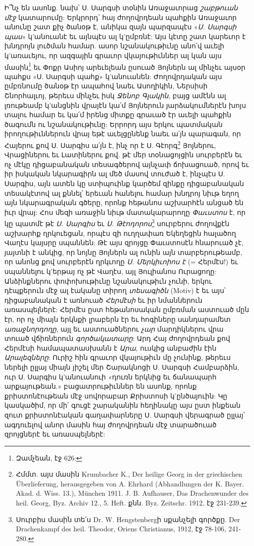 \documentclass{article}
\begin{document}
{Ի՞նչ են ասոնք. նախ՝ Ս. Սարգսի տօնին Առաջաւորաց \emph{շաբթուան մէջ} կատարումը: Երկրորդ՝ հայ ժողովրդեան պահքին Առաջաւոր անունը շատ քիչ ծանօթ է, անիկա զայն պարզապէս «\emph{Ս. Սարգսի պաս}» կ'անուանէ եւ այնպէս ալ կ'ըմբռնէ: Այս կէտը շատ կարեւոր է խնդրոյն լուծման համար. ասոր նշանակութիւնը անո՛վ աւելի կ'առաւեյու, որ ազգային գրաւոր վկայութիւններ ալ կան այս մասին\footnote{Զամչեան, էջ 626:} եւ Փոքր Ասիոյ արեւելեան ըսուած Յոյներն ալ մինչեւ այսօր պահքս «Ս. Սարգսի պահք» կ'անուանեն: Ժողովրդական այս ըմբռնումը ծանօթ էր ապահով նաեւ Ասողիկին, Ներսիսի Շնորհալւոյ, թերեւս մինչեւ իսկ \emph{Ջենոբ Գլակին}, բայց ամէնն ալ լռութեամբ կ'անցնին վրայէն կա՛մ Յոյներուն յարձակումներէն խոյս տալու համար եւ կա՛մ իրենց միտքը գրաւած էր աւելի պահքին ծագումն ու նշանակութիւնը: Երրորդ այս երկու պատմական իրողութիւններուն վրայ եթէ աւելցընենք նաեւ ա՛յն պարագան, որ Հայերու քով Ս. Սարգիս ա՛յն է, ինչ որ է Ս. Գէորգ\footnote{Հմմտ. այս մասին Krumbacher K., Der heilige Georg in der griechischen Überlieferung, herausgegeben von A. Ehrhard (Abhandlungen der K. Bayer. Akad. d. Wiss. 13.), München 1911. J. B. Aufhauser, Das Drachenwunder des heil. Georg, Byz. Archiv 12., 5. Heft. քնն. Byz. Zeitschr. 1912, էջ 231-239.} Յոյներու, Վրացիներու եւ Լատիներու քով. թէ մեր տօնացոյցին սուրբերէն եւ ոչ մէկը դիցաբանական տեսագծերով այնչափ ճոխացուած, որով եւ իր իսկական նկարագիրն ալ մեծ մասով տուժած է, ինչպէս Ս. Սարգիս, այն ատեն կը ստիպուինք կարծեմ զինքը դիցաբանական տեսակէտով ալ քննել՝ երեւան հանելու համար խնդրոյ նիւթ եղող այն նկարագրական գծերը, որոնք հեթանոս աշխարհէն անցած են իւր վրայ: Հոս մեզի առաջին նիւթ մատակարարողը \emph{Փաւստոս} է, որ կը պատմէ թէ \emph{Ս. Սարգիս} եւ \emph{Ս. Թէոդորոս}\footnote{Սուրբիս մասին տե՛ս Dr. W. Hengstenbergի սքանչելի գործքը. Der Drachenkampf des heil. Theodor, Oriens Christianus, 1912, էջ 78-106, 241-280.} սուրբերու ժողովքէն աշխարհք ղրկուեցան, որպէս զի ուղղափառ Եկեղեցին հալածող Վաղէս կայսրը սպաննեն: Թէ այս զրոյցը Փաւստոսէն հնարուած չէ, յայտնի է անկից, որ նոյնը Յոյներն ալ ունին այն տարբերութեամբ, որ անոնց քով սուրբերէն ղրկւողը \emph{Ս. Մերկիւոիոս է} (= Հերմէս!) եւ սպաննելու կ'երթայ ոչ թէ Վաղէս, այլ Յուլիանոս Ուրացողը: Անձինքներու փոփոխութիւնը նշանակութիւն չունի, երկու դէպքերուն մէջ ալ էականը տիրող \emph{տեսագիծն} (Motiv) է եւ այս՝ դիցաբանական է առնուած \emph{Հերմէսի} եւ իր նմաններուն առասպելներէ: Հերմէս ըստ հեթանոսական ըմբռման աստուած մըն էր, որ ոչ միայն երկնքի լրաբերն էր եւ հոգիները սանդարամետ \emph{առաջնորդողը}, այլ եւ աստուածներու \emph{չար} մարդիկներու վրա տուած վճիռներուն \emph{գործակատարը}: Արդ Հայ ժողովրդեան քով Հերմէսի համապատասխանն է \emph{Արա}, ուսկից անբաժին էին \emph{Արալեզները}: Ուրիշ հին գրաւոր վկայութիւն մը չունինք, թերեւս ներելի ըլլայ միայն յիշել մեր Շարակնոցի Ս. Սարգսի Համբարձին, ուր Ս. Սարգիս կ'անուանուի «դուռն երկնից եւ ճանապարհ արքայութեան.» բացատրութիւններ են ասոնք, որոնք քրիստոնէութեան մէջ սովորաբար Քրիստոսի կ'ընծայուին: Կը կասկածիմ, որ մի՛ գուցէ շարականին հեղինակը այս ըստ ինքեան զուտ քրիստոնէական գաղափարները Ս. Սարգսի վերագրած ըլլայ՝ ագդուելով անոր մասին հայ ժողովրդեան մէջ տարածուած զրոյցներէ եւ առասպելներէ:

}
\end{document}
